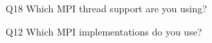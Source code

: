 \begin{description}%
\item{Q18} Which MPI thread support are you using?%
\item{Q12} Which MPI implementations do you use?%
\end{description}%
